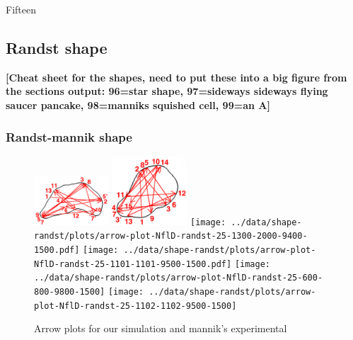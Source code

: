 \documentclass[letterpaper,twocolumn,amsmath,amssymb,pre]{revtex4-1}
\newcommand{\red}[1]{{\bf \color{red} #1}}
\newcommand{\fixme}[1]{\red{[#1]}}
\begin{document}
Fifteen


\subsection{Randst shape}
\fixme{Cheat sheet for the shapes, need to put these into a big figure
  from the sections output: 96=star shape, 97=sideways sideways
  flying saucer pancake, 98=manniks squished cell, 99=an A}

\subsubsection{Randst-mannik shape}
\begin{figure}
  \includegraphics[width=2.8cm]{../mannik-2.png}
  \includegraphics[width=2.8cm]{../mannik-1.png}
  \texttt{[image: ../data/shape-randst/plots/arrow-plot-NflD-randst-25-1300-2000-9400-1500.pdf]}
  \texttt{[image: ../data/shape-randst/plots/arrow-plot-NflD-randst-25-1101-1101-9500-1500.pdf]}
  \texttt{[image: ../data/shape-randst/plots/arrow-plot-NflD-randst-25-600-800-9800-1500]}
  \texttt{[image: ../data/shape-randst/plots/arrow-plot-NflD-randst-25-1102-1102-9500-1500]}
  \caption{Arrow plots for our simulation and mannik's experimental}
  \label{arrow-compare-mannik}
\end{figure}
\end{document}

